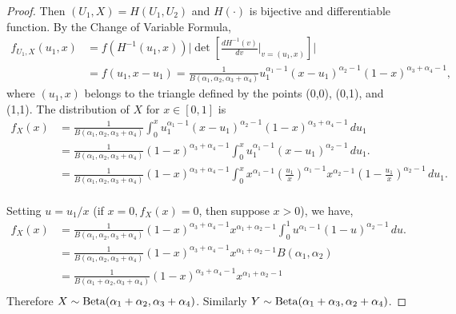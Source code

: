 \begin{proof}
Then $(U_1, X) = H(U_1, U_2)$ and $H(\cdot)$ is bijective and differentiable function. By the Change of Variable Formula, 
\begin{equation}
  \begin{split}
    f_{U_1, X}(u_1, x) &= f({H^{-1}(u_1,x)})\bigg|\det\left[\frac{dH^{-1}(v)}{dv}\bigg|_{v=(u_1,x)}\right]\bigg| \\ 
    &= f(u_1, x - u_1) = \frac{1}{B(\alpha_1, \alpha_2, \alpha_3+\alpha_4)}u_1^{\alpha_1-1}(x-u_1)^{\alpha_2-1}(1-x)^{\alpha_3+\alpha_4-1}, 
  \end{split}
\end{equation}
where $(u_1, x)$ belongs to the triangle defined by the points (0,0),
(0,1), and (1,1). The distribution of $X$ for $x \in [0,1]$ is
\begin{equation}
  \begin{split}
    f_X(x) &= \frac{1}{B(\alpha_1, \alpha_2, \alpha_3+\alpha_4)}\int_{0}^{x} u_1^{\alpha_1-1}(x-u_1)^{\alpha_2-1}(1-x)^{\alpha_3+\alpha_4-1} \, du_1 \\
    &= \frac{1}{B(\alpha_1, \alpha_2, \alpha_3+\alpha_4)}(1-x)^{\alpha_3+\alpha_4-1} \int_{0}^{x} u_1^{\alpha_1-1}(x-u_1)^{\alpha_2-1} \, du_1. \\
    &= \frac{1}{B(\alpha_1, \alpha_2, \alpha_3+\alpha_4)}(1-x)^{\alpha_3+\alpha_4-1} \int_{0}^{x} x^{\alpha_1-1} \left(\frac{u_1}{x}\right)^{\alpha_1-1}x^{\alpha_2 - 1}\left(1-\frac{u_1}{x}\right)^{\alpha_2-1} \, du_1. \\
  \end{split}
\end{equation}

Setting $u = u_1/x$ (if $x = 0, f_X(x) = 0$, then suppose $x > 0$), we have, 
\begin{equation}
  \begin{split}
    f_X(x) &= \frac{1}{B(\alpha_1, \alpha_2, \alpha_3+\alpha_4)}(1-x)^{\alpha_3+\alpha_4-1} x^{\alpha_1+\alpha_2-1} \int_{0}^{1} u^{\alpha_1-1}(1-u)^{\alpha_2-1} \, du. \\
    &= \frac{1}{B(\alpha_1, \alpha_2, \alpha_3+\alpha_4)}(1-x)^{\alpha_3+\alpha_4-1} x^{\alpha_1+\alpha_2-1} B(\alpha_1, \alpha_2)\\
    &= \frac{1}{B(\alpha_1 + \alpha_2, \alpha_3+\alpha_4)}(1-x)^{\alpha_3+\alpha_4-1} x^{\alpha_1+\alpha_2-1}\\
  \end{split}
\end{equation}
Therefore $X \sim \operatorname{Beta}(\alpha_1+\alpha_2, \alpha_3+\alpha_4)$. Similarly $Y \sim \operatorname{Beta}(\alpha_1+\alpha_3, \alpha_2 + \alpha_4)$.

\end{proof}

